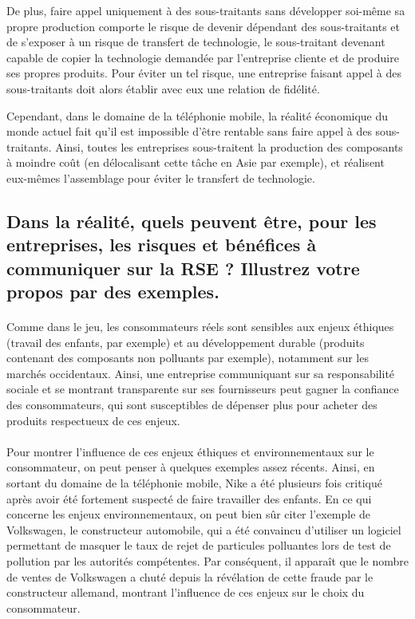\documentclass[a4paper,11pt]{article}
\theoremstyle{remark}
\begin{document}
		De plus, faire appel uniquement à des sous-traitants sans développer soi-même sa propre production comporte le risque de devenir dépendant des sous-traitants et de s'exposer à un risque de transfert de technologie, le sous-traitant devenant capable de copier la technologie demandée par l'entreprise cliente et de produire ses propres produits.
		Pour éviter un tel risque, une entreprise faisant appel à des sous-traitants doit alors établir avec eux une relation de fidélité.

		Cependant, dans le domaine de la téléphonie mobile, la réalité économique du monde actuel fait qu'il est impossible d'être rentable sans faire appel à des sous-traitants.
		Ainsi, toutes les entreprises sous-traitent la production des composants à moindre coût (en délocalisant cette tâche en Asie par exemple), et réalisent eux-mêmes l'assemblage pour éviter le transfert de technologie.

	\subsection{Dans la réalité, quels peuvent être, pour les entreprises, les risques et bénéfices à communiquer sur la RSE ? Illustrez votre propos par des exemples.}

		\paragraph{}
		Comme dans le jeu, les consommateurs réels sont sensibles aux enjeux éthiques (travail des enfants, par exemple) et au développement durable (produits contenant des composants non polluants par exemple), notamment sur les marchés occidentaux.
		Ainsi, une entreprise communiquant sur sa responsabilité sociale et se montrant transparente sur ses fournisseurs peut gagner la confiance des consommateurs, qui sont susceptibles de dépenser plus pour acheter des produits respectueux de ces enjeux. 

		\paragraph{}
		Pour montrer l'influence de ces enjeux éthiques et environnementaux sur le consommateur, on peut penser à quelques exemples assez récents.
		Ainsi, en sortant du domaine de la téléphonie mobile, Nike a été plusieurs fois critiqué après avoir été fortement suspecté de faire travailler des enfants.
		En ce qui concerne les enjeux environnementaux, on peut bien sûr citer l'exemple de Volkswagen, le constructeur automobile, qui a été convaincu d'utiliser un logiciel permettant de masquer le taux de rejet de particules polluantes lors de test de pollution par les autorités compétentes.
		Par conséquent, il apparaît que le nombre de ventes de Volkswagen a chuté depuis la révélation de cette fraude par le constructeur allemand, montrant l'influence de ces enjeux sur le choix du consommateur.
		
\end{document}
